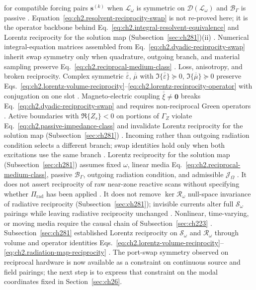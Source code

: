 for compatible forcing pairs \(\mathbf{s}^{(k)}\) when \(\mathcal{L}_\omega\) is symmetric on
\(\mathcal{D}(\mathcal{L}_\omega)\) and \(\mathcal{B}_\Gamma\) is passive
\cite{stratton1941}. Equation~\eqref{eq:ch2.resolvent-reciprocity-swap} is not
re-proved here; it is the operator backbone behind
Eq.~\eqref{eq:ch2.integral-resolvent-equivalence} and Lorentz reciprocity for the solution map (Subsection~\ref{sec:ch281})(ii) \cite{stratton1941}. Numerical integral-equation matrices
assembled from Eq.~\eqref{eq:ch2.dyadic-reciprocity-swap} inherit swap symmetry only when
quadrature, outgoing branch, and material sampling preserve
Eq.~\eqref{eq:ch2.reciprocal-medium-class} \cite{harrington2001}.
Loss, anisotropy, and broken reciprocity. Complex symmetric \(\overline{\overline{\varepsilon}}\), \(\overline{\overline{\mu}}\) with
\(\Im\{\overline{\overline{\varepsilon}}\}\succeq 0\), \(\Im\{\overline{\overline{\mu}}\}\succeq 0\)
preserve Eqs.~\eqref{eq:ch2.lorentz-volume-reciprocity}--\eqref{eq:ch2.lorentz-reciprocity-operator}
with conjugation on one slot \cite{stratton1941}. Magneto-electric coupling
\(\overline{\overline{\xi}}\neq\mathbf{0}\) breaks Eq.~\eqref{eq:ch2.dyadic-reciprocity-swap}
and requires non-reciprocal Green operators \cite{stratton1941}. Active boundaries
with \(\Re\{Z_s\}<0\) on portions of \(\Gamma_Z\) violate
Eq.~\eqref{eq:ch2.passive-impedance-class} and invalidate Lorentz reciprocity for the solution map (Subsection~\ref{sec:ch281}) \cite{stratton1941}. Incoming rather
than outgoing radiation condition selects a different branch; swap identities hold only when both excitations
use the same branch \cite{stratton1941}. Lorentz reciprocity for the solution map (Subsection~\ref{sec:ch281}) assumes fixed \(\omega\), linear media
Eq.~\eqref{eq:ch2.reciprocal-medium-class}, passive \(\mathcal{B}_\Gamma\), outgoing radiation condition,
and admissible \(\mathcal{J}_\Omega\) \cite{stratton1941}. It does not assert
reciprocity of raw near-zone reactive scans without specifying whether \(\Pi_{\mathrm{rad}}\)
has been applied \cite{stratton1941}. It does not remove \(\ker\mathcal{R}_\omega\)
null-space invariance of radiative reciprocity (Subsection~\ref{sec:ch281}); invisible currents alter full
\(\mathcal{S}_\omega\) pairings while leaving radiative reciprocity unchanged
\cite{harrington2001}. Nonlinear, time-varying, or moving media require the causal chain of
Subsection~\ref{sec:ch223} \cite{stratton1941}.
Subsection~\ref{sec:ch281} established Lorentz reciprocity on \(\mathcal{S}_\omega\) and
\(\mathcal{R}_\omega\) through volume and operator identities
Eqs.~\eqref{eq:ch2.lorentz-volume-reciprocity}--\eqref{eq:ch2.radiation-map-reciprocity}
\cite{stratton1941}. The port-swap symmetry observed on reciprocal hardware is now available as a
constraint on continuous source and field pairings; the next step is to express that constraint on
the modal coordinates fixed in Section~\ref{sec:ch26}.
